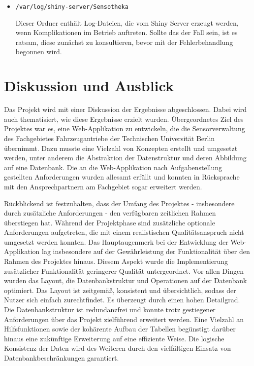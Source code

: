 \documentclass[
]{article}
\begin{document}
\begin{itemize}
\item
  \texttt{/var/log/shiny-server/Sensotheka}

  Dieser Ordner enthält Log-Dateien, die vom Shiny Server erzeugt werden, wenn Komplikationen im Betrieb auftreten. Sollte das der Fall sein, ist es ratsam, diese zunächst zu konsultieren, bevor mit der Fehlerbehandlung begonnen wird.
\end{itemize}

\hypertarget{discussion}{%
\section{Diskussion und Ausblick}\label{discussion}}

Das Projekt wird mit einer Diskussion der Ergebnisse abgeschlossen. Dabei wird auch thematisiert, wie diese Ergebnisse erzielt wurden.
Übergeordnetes Ziel des Projektes war es, eine Web-Applikation zu entwickeln, die die Sensorverwaltung des Fachgebietes Fahrzeugantriebe der Technischen Universität Berlin übernimmt. Dazu musste eine Vielzahl von Konzepten erstellt und umgesetzt werden, unter anderem die Abstraktion der Datenstruktur und deren Abbildung auf eine Datenbank. Die an die Web-Applikation nach Aufgabenstellung gestellten Anforderungen wurden allesamt erfüllt und konnten in Rücksprache mit den Ansprechpartnern am Fachgebiet sogar erweitert werden.

Rückblickend ist festzuhalten, dass der Umfang des Projektes - insbesondere durch zusätzliche Anforderungen - den verfügbaren zeitlichen Rahmen überstiegen hat. Während der Projektphase sind zusätzliche optionale Anforderungen aufgetreten, die mit einem realistischen Qualitätsanspruch nicht umgesetzt werden konnten. Das Hauptaugenmerk bei der Entwicklung der Web-Applikation lag insbesondere auf der Gewährleistung der Funktionalität über den Rahmen des Projektes hinaus. Diesem Aspekt wurde die Implementierung zusätzlicher Funktionalität geringerer Qualität untergeordnet. Vor allen Dingen wurden das Layout, die Datenbankstruktur und Operationen auf der Datenbank optimiert. Das Layout ist zeitgemäß, konsistent und übersichtlich, sodass der Nutzer sich einfach zurechtfindet. Es überzeugt durch einen hohen Detailgrad. Die Datenbankstruktur ist redundanzfrei und konnte trotz gestiegener Anforderungen über das Projekt zielführend erweitert werden. Eine Vielzahl an Hilfsfunktionen sowie der kohärente Aufbau der Tabellen begünstigt darüber hinaus eine zukünftige Erweiterung auf eine effiziente Weise. Die logische Konsistenz der Daten wird des Weiteren durch den vielfältigen Einsatz von Datenbankbeschränkungen garantiert.
\end{document}
